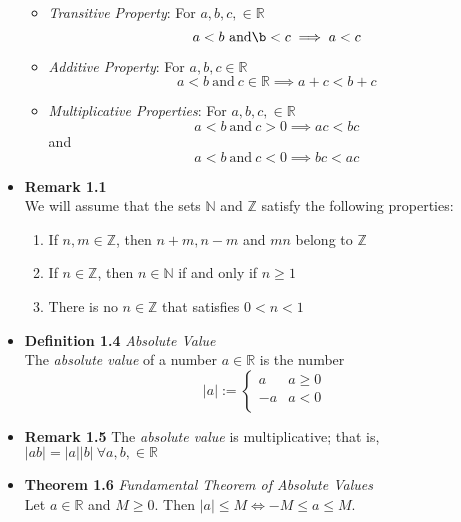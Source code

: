 \documentclass[11pt,a4paper]{article}
\begin{document}
\begin{itemize}
\begin{itemize}
            \item \emph{Transitive Property}:
                For $a, b, c, \in \mathbb{R}$
                \[
                    a < b \ \text{and} \b < c \implies a < c
                \]

            \item \emph{Additive Property}:
                For $a, b, c \in \mathbb{R}$
                \[
                    a < b \ \text{and} \ c \in \mathbb{R} \implies a + c < b + c
                \]

            \item \emph{Multiplicative Properties}:
                For $a, b, c, \in \mathbb{R}$
                \[
                    a < b \ \text{and} \ c > 0 \implies ac < bc
                \]
                and
                \[
                    a < b \ \text{and} \ c < 0 \implies bc < ac
                \]
        \end{itemize}

    \item \textbf{Remark 1.1} \\
        We will assume that the sets $\mathbb{N}$ and $\mathbb{Z}$ satisfy the following
        properties:
        \begin{enumerate}
            \item If $n, m \in \mathbb{Z}$, then $n + m, n - m$ and $mn$ belong to $\mathbb{Z}$
            \item If $n \in \mathbb{Z}$, then $n \in \mathbb{N}$ if and only if $n \geq 1$
            \item There is no $n \in \mathbb{Z}$ that satisfies $0 < n < 1$
        \end{enumerate}

    \item \textbf{Definition 1.4} \emph{Absolute Value} \\
        The \emph{absolute value} of a number $a \in \mathbb{R}$ is the number
        \[
            |a| :=
            \begin{cases}{}
                a  & a \geq 0 \\
                -a & a < 0 \\
            \end{cases}
        \]

    \item \textbf{Remark 1.5} The \emph{absolute value} is multiplicative;
        that is, $|ab| = |a||b| \ \forall a, b, \in \mathbb{R}$

    \item \textbf{Theorem 1.6} \emph{Fundamental Theorem of Absolute Values} \\
        Let $a \in \mathbb{R}$ and $M \geq 0$.
        Then $|a| \leq M \iff -M \leq a \leq M$.


\end{itemize}
\end{document}
